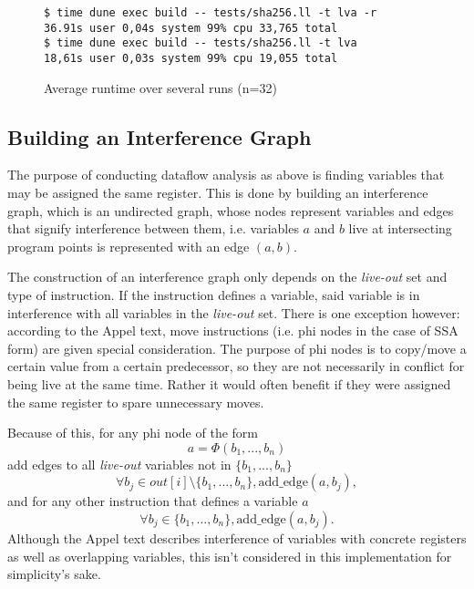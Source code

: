 \documentclass{article}
\begin{document}
\begin{figure}[H]
  \centering
  \begin{minipage}[b]{0.69\textwidth}
    \begin{verbatim}
$ time dune exec build -- tests/sha256.ll -t lva -r
36.91s user 0,04s system 99% cpu 33,765 total
$ time dune exec build -- tests/sha256.ll -t lva
18,61s user 0,03s system 99% cpu 19,055 total
    \end{verbatim}
    \caption{Average runtime over several runs (n=32)}\label{fig:lva-time}
  \end{minipage}
\end{figure}


\subsection{Building an Interference Graph}

The purpose of conducting dataflow analysis as above is finding variables that may be assigned the same register. This is done by building an interference graph, which is an undirected graph, whose nodes represent variables and edges that signify interference between them, i.e. variables \(a\) and \(b\) live at intersecting program points is represented with an edge \((a,b)\).


The construction of an interference graph only depends on the \textit{live-out} set and type of instruction. If the instruction defines a variable, said variable is in interference with all variables in the \textit{live-out} set. There is one exception however: according to the Appel text, move instructions (i.e. phi nodes in the case of SSA form) are given special consideration. The purpose of phi nodes is to copy/move a certain value from a certain predecessor, so they are not necessarily in conflict for being live at the same time. Rather it would often benefit if they were assigned the same register to spare unnecessary moves. %


Because of this, for any phi node of the form 
\begin{equation}
 a = \Phi (b_1, ..., b_n) \label{phi}
\end{equation}
add edges to all \textit{live-out} variables not in \(\{b_1, ..., b_n\}\)
\[
  \forall b_j \in \mathit{out}[i] \setminus \{b_1, ..., b_n\}, \text{add\_edge}(a, b_j),
\]
and for any other instruction that defines a variable \(a\)
\[
  \forall b_j \in \{b_1, ..., b_n\}, \text{add\_edge}(a, b_j).
\]
Although the Appel text \cite{tiger} describes interference of variables with concrete registers as well as overlapping variables, this isn't considered in this implementation %
for simplicity's sake.
\end{document}
